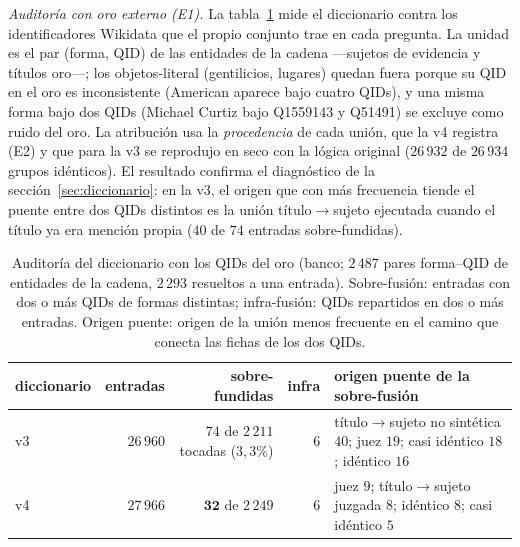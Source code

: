 \documentclass[11pt,a4paper]{article}
\begin{document}
\emph{Auditoría con oro externo (E1).} La tabla~\ref{tab:auditoria-qid} mide
el diccionario contra los identificadores Wikidata que el propio conjunto trae
en cada pregunta. La unidad es el par (forma, QID) de las entidades de la
cadena ---sujetos de evidencia y títulos oro---; los objetos-literal
(gentilicios, lugares) quedan fuera porque su QID en el oro es inconsistente
(\guillemotleft{}American\guillemotright{} aparece bajo cuatro QIDs), y una misma forma bajo dos
QIDs (\guillemotleft{}Michael Curtiz\guillemotright{} bajo Q1559143 y Q51491) se excluye como ruido
del oro. La atribución usa la \emph{procedencia} de cada unión, que la v4
registra (E2) y que para la v3 se reprodujo en seco con la lógica original
($26\,932$ de $26\,934$ grupos idénticos). El resultado confirma el
diagnóstico de la sección~\ref{sec:diccionario}: en la v3, el origen que con
más frecuencia tiende el puente entre dos QIDs distintos es la unión
título$\to$sujeto ejecutada cuando el título ya era mención propia ($40$ de
$74$ entradas sobre-fundidas).

\begin{table}[t]
\centering\footnotesize\setlength{\tabcolsep}{4pt}
\caption{Auditoría del diccionario con los QIDs del oro (banco; $2\,487$ pares
forma--QID de entidades de la cadena, $2\,293$ resueltos a una entrada).
Sobre-fusión: entradas con dos o más QIDs de formas distintas; infra-fusión:
QIDs repartidos en dos o más entradas. \guillemotleft{}Origen puente\guillemotright{}: origen de la
unión menos frecuente en el camino que conecta las fichas de los dos QIDs.}
\label{tab:auditoria-qid}
\begin{tabular}{lrrrl}
\toprule
diccionario & entradas & sobre-fundidas & infra & origen puente de la sobre-fusión\\
\midrule
v3 & $26\,960$ & $74$ de $2\,211$ tocadas ($3{,}3\%$) & $6$ & título$\to$sujeto no sintética $40$; juez $19$; casi idéntico $18$; idéntico $16$\\
v4 & $27\,966$ & $\mathbf{32}$ de $2\,249$ & $6$ & juez $9$; título$\to$sujeto juzgada $8$; idéntico $8$; casi idéntico $5$\\
\bottomrule
\end{tabular}
\end{table}
\end{document}
